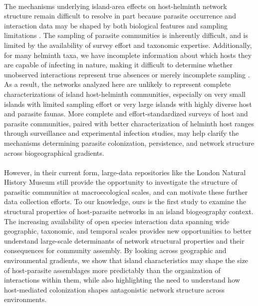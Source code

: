 \paragraph*{} The mechanisms underlying island-area effects on host-helminth network structure remain difficult to resolve in part because parasite occurrence and interaction data may be shaped by both biological features and sampling limitations \parencite{nielsen2007ecological, llopis2023sensitivity}. The sampling of parasite communities is inherently difficult, and is limited by the availability of survey effort and taxonomic expertise. Additionally, for many helminth taxa, we have incomplete information about which hosts they are capable of infecting in nature, making it difficult to determine whether unobserved interactions represent true absences or merely incomplete sampling \parencite{poulin2016missing, walker2017uncertain, farrell2022predicting}. As a result, the networks analyzed here are unlikely to represent complete characterizations of island host-helminth communities, especially on very small islands with limited sampling effort or very large islands with highly diverse host and parasite faunas. More complete and effort-standardized surveys of host and parasite communities, paired with better characterization of helminth host ranges through surveillance and experimental infection studies, may help clarify the mechanisms determining parasite colonization, persistence, and network structure across biogeographical gradients.

\paragraph*{} However, in their current form, large-data repositories like the London Natural History Museum \parencite{gibson2005} still provide the opportunity to investigate the structure of parasitic communities at macroecological scales, and can motivate these further data collection efforts. To our knowledge, ours is the first study to examine the structural properties of host-parasite networks in an island biogeography context. The increasing availability of open species interaction data spanning wide geographic, taxonomic, and temporal scales provides new opportunities to better understand large-scale determinants of network structural properties and their consequences for community assembly. By looking across geographic and environmental gradients, we show that island characteristics may shape the size of host-parasite assemblages more predictably than the organization of interactions within them, while also highlighting the need to understand how host-mediated colonization shapes antagonistic network structure across environments.


